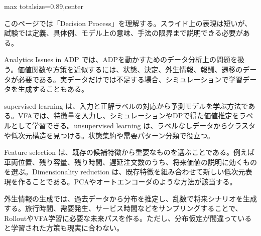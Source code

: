 \begin{minipage}[t]{0.58\textwidth}
\begin{adjustbox}{max totalsize={\textwidth}{0.89\textheight},center}
\begin{minipage}{\textwidth}\scriptsize
{}このページでは「Decision Process」を理解する。スライド上の表現は短いが、試験では定義、具体例、モデル上の意味、手法の限界まで説明できる必要がある。\par
Analytics Issues in ADP では、ADPを動かすためのデータ分析上の問題を扱う。価値関数や方策を近似するには、状態、決定、外生情報、報酬、遷移のデータが必要である。実データだけでは不足する場合、シミュレーションで学習データを生成することもある。\par
supervised learning は、入力と正解ラベルの対応から予測モデルを学ぶ方法である。VFAでは、特徴量を入力し、シミュレーションやDPで得た価値推定をラベルとして学習できる。unsupervised learning は、ラベルなしデータからクラスタや低次元構造を見つける。状態集約や需要パターン分類で役立つ。\par
Feature selection は、既存の候補特徴から重要なものを選ぶことである。例えば車両位置、残り容量、残り時間、遅延注文数のうち、将来価値の説明に効くものを選ぶ。Dimensionality reduction は、既存特徴を組み合わせて新しい低次元表現を作ることである。PCAやオートエンコーダのような方法が該当する。\par
外生情報の生成では、過去データから分布を推定し、乱数で将来シナリオを生成する。旅行時間、需要発生、サービス時間などをサンプリングすることで、RolloutやVFA学習に必要な未来パスを作る。ただし、分布仮定が間違っていると学習された方策も現実に合わない。\par

\end{minipage}
\end{adjustbox}
\end{minipage}
